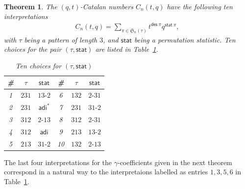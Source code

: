 \documentclass[12pt,reqno]{amsart}
\numberwithin{equation}{section}
\theoremstyle{plain}
\newtheorem{theorem}{Theorem}[section]
\theoremstyle{definition}
\def\S{\mathfrak{S}}
\def\ai{\mathsf{adi}}
\def\des{\mathsf{des}}
\def\cab{31\text{-}2}
\def\bca{2\text{-}31}
\def\acb{13\text{-}2}
\def\bac{2\text{-}13}
\def\stat{\mathsf{stat}}
\begin{document}
\begin{theorem}\label{qnara}
The $(q,t)$-Catalan numbers $C_n(t, q)$ have the following ten interpretations
\begin{align*}
C_n(t, q)=\sum_{\pi\in\S_n(\tau)}t^{\des\:\pi}q^{\stat\:\pi},
\end{align*}
with $\tau$ being a pattern of length $3$, and $\stat$ being a permutation statistic. Ten choices for the pair $(\tau,\stat)$ are listed in Table~\ref{ten}.
\begin{table}[tbp]\caption{Ten choices for $(\tau,\stat)$}\label{ten}
\centering
\begin{tabular}{|c|c|c||c|c|c|}
\hline
\# & $\tau$ & $\stat$ & \# & $\tau$ & $\stat$\\
\hline
1 & $231$ & $\acb$ & 6 & $132$ & $\bca$\\
2 & $231$ & $\ai^*$ & 7 & $231$ & $\cab$\\
3 & $312$ & $\bac$ & 8 & $312$ & $\bca$\\
4 & $312$ & $\ai$ & 9 & $213$ & $\acb$\\
5 & $213$ & $\cab$ & 10 & $132$ & $\bac$\\
\hline
\end{tabular}
\end{table}







\end{theorem}

The last four interpretations for the $\gamma$-coefficients given in the next theorem correspond in a natural way to the interpretaions labelled as entries $1,3,5,6$ in Table~\ref{ten}.
\end{document}
